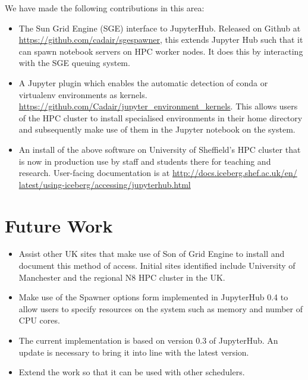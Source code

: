 \documentclass{deliverablereport}
\begin{document}
We have made the following contributions in this area:

\begin{itemize}
\item The Sun Grid Engine (SGE) interface to JupyterHub. Released on Github at \url{https://github.com/cadair/sgespawner}, this extends Jupyter Hub such that it can spawn notebook servers on HPC worker nodes. It does this by interacting with the SGE queuing system.
\item A Jupyter plugin which enables the automatic detection of conda or virtualenv environments as kernels. \url{https://github.com/Cadair/jupyter_environment_kernels}. This allows users of the HPC cluster to install specialised environments in their home directory and subsequently make use of them in the Jupyter notebook on the system.
\item An install of the above software on University of Sheffield's HPC cluster that is now in production use by staff and students there for teaching and research. User-facing documentation is at \url{http://docs.iceberg.shef.ac.uk/en/
latest/using-iceberg/accessing/jupyterhub.html}
\end{itemize}

\section{Future Work}
\begin{itemize}
\item Assist other UK sites that make use of Son of Grid Engine to install and document this method of access. Initial sites identified include University of Manchester and the regional N8 HPC cluster in the UK.
\item Make use of the Spawner options form implemented in JupyterHub 0.4 to allow users to specify resources on the system such as memory and number of CPU cores.
\item The current implementation is based on version 0.3 of JupyterHub. An update is necessary to bring it into line with the latest version.
\item Extend the work so that it can be used with other schedulers.
\end{itemize}
\end{document}
